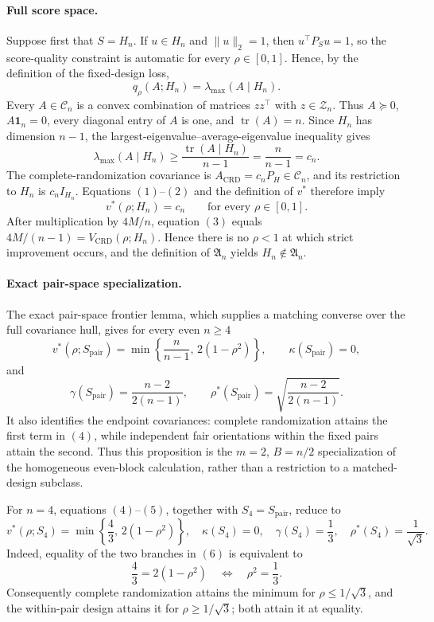 \paragraph{Full score space.}
Suppose first that \(S=H_n\).  If \(u\in H_n\) and \(\|u\|_2=1\), then \(u^\top P_Su=1\), so the score-quality constraint is automatic for every \(\rho\in[0,1]\).  Hence, by the definition of the fixed-design loss,
\[
q_\rho(A;H_n)=\lambda_{\max}(A\mid H_n).
\tag{1}
\]
Every \(A\in\mathcal C_n\) is a convex combination of matrices \(zz^\top\) with \(z\in\mathcal Z_n\).  Thus \(A\succeq0\), \(A\mathbf 1_n=0\), every diagonal entry of \(A\) is one, and \(\operatorname{tr}(A)=n\).  Since \(H_n\) has dimension \(n-1\), the largest-eigenvalue--average-eigenvalue inequality gives
\[
\lambda_{\max}(A\mid H_n)
\geq \frac{\operatorname{tr}(A\mid H_n)}{n-1}
=\frac{n}{n-1}=c_n.
\tag{2}
\]
The complete-randomization covariance is \(A_{\mathrm{CRD}}=c_nP_H\in\mathcal C_n\), and its restriction to \(H_n\) is \(c_nI_{H_n}\).  Equations \((1)\)--\((2)\) and the definition of \(v^*\) therefore imply
\[
v^*(\rho;H_n)=c_n
\qquad\text{for every }\rho\in[0,1].
\tag{3}
\]
After multiplication by \(4M/n\), equation \((3)\) equals \(4M/(n-1)=V_{\mathrm{CRD}}(\rho;H_n)\).  Hence there is no \(\rho<1\) at which strict improvement occurs, and the definition of \(\mathfrak A_n\) yields \(H_n\notin\mathfrak A_n\).

\paragraph{Exact pair-space specialization.}
The exact pair-space frontier lemma, which supplies a matching converse over the full covariance hull, gives for every even \(n\geq4\)
\[
v^*(\rho;S_{\mathrm{pair}})
=\min\left\{\frac{n}{n-1},\,2(1-\rho^2)\right\},
\qquad
\kappa(S_{\mathrm{pair}})=0,
\tag{4}
\]
and
\[
\gamma(S_{\mathrm{pair}})=\frac{n-2}{2(n-1)},
\qquad
\rho^*(S_{\mathrm{pair}})=
\sqrt{\frac{n-2}{2(n-1)}}.
\tag{5}
\]
It also identifies the endpoint covariances: complete randomization attains the first term in \((4)\), while independent fair orientations within the fixed pairs attain the second.  Thus this proposition is the \(m=2\), \(B=n/2\) specialization of the homogeneous even-block calculation, rather than a restriction to a matched-design subclass.

For \(n=4\), equations \((4)\)--\((5)\), together with \(S_4=S_{\mathrm{pair}}\), reduce to
\[
v^*(\rho;S_4)=\min\left\{\frac43,\,2(1-\rho^2)\right\},
\quad
\kappa(S_4)=0,
\quad
\gamma(S_4)=\frac13,
\quad
\rho^*(S_4)=\frac1{\sqrt3}.
\tag{6}
\]
Indeed, equality of the two branches in \((6)\) is equivalent to
\[
\frac43=2(1-\rho^2)
\quad\Longleftrightarrow\quad
\rho^2=\frac13.
\tag{7}
\]
Consequently complete randomization attains the minimum for \(\rho\leq1/\sqrt3\), and the within-pair design attains it for \(\rho\geq1/\sqrt3\); both attain it at equality.

